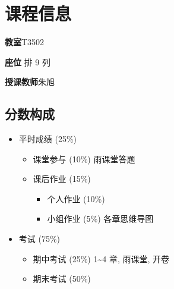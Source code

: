 \section*{课程信息} \label{课程信息}

\textbf{教室}\quad T3502 \par
\textbf{座位} 排 9 列 \par
\textbf{授课教师}\quad 朱旭

\subsection*{分数构成}
\begin{itemize}
    \item 平时成绩 (25\%)
          \begin{itemize}
              \item 课堂参与 (10\%) 雨课堂答题
              \item 课后作业 (15\%)
                    \begin{itemize}
                        \item 个人作业 (10\%)
                        \item 小组作业 (5\%) 各章思维导图
                    \end{itemize}
          \end{itemize}
    \item 考试 (75\%)
          \begin{itemize}
              \item 期中考试 (25\%) 1\textasciitilde 4 章, 雨课堂, 开卷
              \item 期末考试 (50\%)
          \end{itemize}
\end{itemize}
